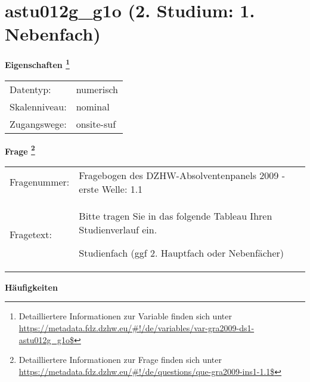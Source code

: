 
    \setcounter{footnote}{0}

    \vspace*{-1.8cm}
	\section{astu012g\_g1o (2. Studium: 1. Nebenfach)}
	\label{section:astu012g_g1o}



    \vspace*{0.5cm}
    \noindent\textbf{Eigenschaften
	\footnote{Detailliertere Informationen zur Variable finden sich unter
		\url{https://metadata.fdz.dzhw.eu/\#!/de/variables/var-gra2009-ds1-astu012g_g1o$}}}\\
	\begin{tabularx}{\hsize}{@{}lX}
	Datentyp: & numerisch \\
	Skalenniveau: & nominal \\
	Zugangswege: &
	  onsite-suf
 \\
    \end{tabularx}



				\vspace*{0.5cm}
                \noindent\textbf{Frage
	                \footnote{Detailliertere Informationen zur Frage finden sich unter
		              \url{https://metadata.fdz.dzhw.eu/\#!/de/questions/que-gra2009-ins1-1.1$}}}\\
				\begin{tabularx}{\hsize}{@{}lX}
					Fragenummer: &
					  Fragebogen des DZHW-Absolventenpanels 2009 - erste Welle:
					  1.1
 \\
					Fragetext: & Bitte tragen Sie in das folgende Tableau Ihren Studienverlauf ein.\par  Studienfach (ggf 2. Hauptfach oder Nebenfächer) \\
				\end{tabularx}





        		\vspace*{0.5cm}
                \noindent\textbf{Häufigkeiten}

